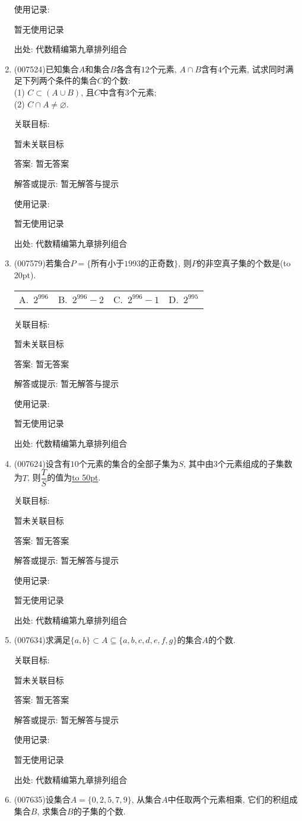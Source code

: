 \documentclass[10pt,a4paper]{article}
\newcommand{\blank}[1]{\underline{\hbox to #1pt{}}}
\newcommand{\bracket}[1]{(\hbox to #1pt{})}
\newcommand{\fourch}[4]{\par\begin{tabular}{p{.23\textwidth}p{.23\textwidth}p{.23\textwidth}p{.23\textwidth}}
A.~#1 &B.~#2& C.~#3& D.~#4
\end{tabular}}
\begin{document}
\begin{enumerate}[1.]
使用记录:

暂无使用记录


出处: 代数精编第九章排列组合
\item { (007524)}已知集合$A$和集合$B$各含有$12$个元素, $A\cap B$含有$4$个元素, 试求同时满足下列两个条件的集合$C$的个数:\\
(1) $C\subset (A\cup B)$, 且$C$中含有$3$个元素;\\
(2) $C\cap A\ne \varnothing$.


关联目标:

暂未关联目标

答案: 暂无答案

解答或提示: 暂无解答与提示

使用记录:

暂无使用记录


出处: 代数精编第九章排列组合
\item { (007579)}若集合$P=\{\text{所有小于}1993\text{的正奇数}\}$, 则$P$的非空真子集的个数是\bracket{20}.
\fourch{$2^{996}$}{$2^{996}-2$}{$2^{996}-1$}{$2^{995}$}


关联目标:

暂未关联目标

答案: 暂无答案

解答或提示: 暂无解答与提示

使用记录:

暂无使用记录


出处: 代数精编第九章排列组合
\item { (007624)}设含有$10$个元素的集合的全部子集为$S$, 其中由$3$个元素组成的子集数为$T$, 则$\dfrac TS$的值为\blank{50}.


关联目标:

暂未关联目标

答案: 暂无答案

解答或提示: 暂无解答与提示

使用记录:

暂无使用记录


出处: 代数精编第九章排列组合
\item { (007634)}求满足$\{a,b\}\subset A\subseteq \{a,b,c,d,e,f,g\}$的集合$A$的个数.


关联目标:

暂未关联目标

答案: 暂无答案

解答或提示: 暂无解答与提示

使用记录:

暂无使用记录


出处: 代数精编第九章排列组合
\item { (007635)}设集合$A=\{0,2,5,7,9\}$, 从集合$A$中任取两个元素相乘, 它们的积组成集合$B$, 求集合$B$的子集的个数.



\end{enumerate}
\end{document}
